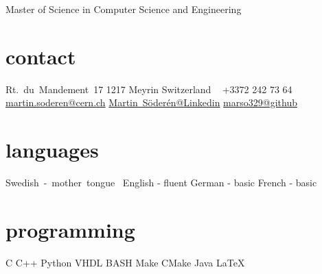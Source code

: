 \documentclass[]{cv-style}          %
\begin{document}
       {Master of Science in Computer Science and Engineering}        %


\begin{aside}
%
\section{contact}
Rt.~du~Mandement~17
1217 Meyrin
Switzerland
~
+3372 242 73 64
    ~
    \href{mailto:martin.soderen@cern.ch}{martin.soderen@cern.ch}
    \href{https://se.linkedin.com/in/martin-s%C3%B6der%C3%A9n-272002a7}{\mbox{Martin Söderén@Linkedin}}
        \href{https://github.com/marso329}{\mbox{marso329@github}}
\section{languages}
    \mbox{Swedish - mother tongue  }
    English - fluent
    German - basic  
    French - basic
\section{programming}
C 
C++ 
Python   
VHDL          
BASH            
Make               
CMake          
Java      
\LaTeX{} 
% 
\end{aside}

\end{document}
